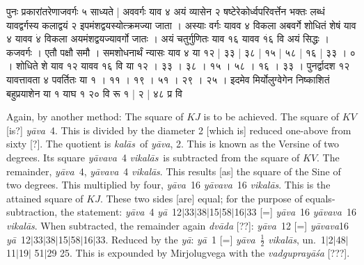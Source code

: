 \documentclass[11pt,a5paper]{book}
\def\kalas{\textit{ka\-l\=as}}
\def\ya{\textit{y\=a}}
\def\yava{\textit{y\=ava}}
\def\yavava{\textit{y\=avava}}
\def\vikalas{\textit{vi\-ka\-l\=as}}
\def\danda{$|$}
\begin{document}
{\iffalse 
\begin{center}
\texttt{[image: 9v.png]}
\captionof{figure}{9v}
\end{center}
\fi 


\newpage
{\s पुनः प्रकारांतरेणाजवर्गः ५ साध्यते | अववर्गः याव ४
अयं व्यासेन २ षष्टेरेकोर्ध्वपरिवर्त्तेन भक्तः लब्धं
यावद्वर्गस्य कलाद्वयं २ इपमंशद्वयस्योत्क्रमज्या जाता । अस्याः वर्गः यावव ४
विकला अबवर्गे शोधितं शेषं याव ४ यावव $\dot{४}$ विकला अयमंशद्वयज्यावर्गो
जातः । अयं चतुर्गुणितः याव १६ यावव $\dot{१६}$ वि अयं
सिद्धः । कजवर्गः । एतौ पक्षौ समौ । समशोधनार्थं न्यासः याव ४ या १२ |
३३ | ३८ | १५ | ५८ | १६ | ३३ । ० । 
शोधिते शे याव १२  यावव १६  वि या १२ । ३३ । ३८ । १५ । ५८ । १६ । ३३ ।  
पुनर्द्वादश १२ यावत्तावता ४ पवर्तितः या १ । ११ । १९ । ५१ । २९ । २५ ।
इदमेव मिर्योलुग्वेगेन निष्काशितं बहुप्रयाशेन
या १ याघ १ २० वि रू १ | २ | ४८ प्र वि }
\newpage

Again, by another method: The square of $KJ$ is to be achieved. The square of $KV$
[is?] \yava\ 4. This is divided by the diameter 2 [which is] reduced one-above from sixty [?].
The quotient is \kalas\ of \yava, 2. This is known as the Versine of two degrees. 
Its square \yavava\ 4 \vikalas\ is subtracted from the square of $KV$. The remainder, 
\yava\ 4, \yavava\ 4 \vikalas.  This results [as] the square of the Sine of two degrees.
This 
multiplied by four, \yava\ 16 \yavava\ 16 \vikalas. This is the attained square of $KJ$. 
These two sides [are] equal; for the purpose of equals-subtraction, the statement:
\yava\ 4 \ya\ 12\danda 33\danda 38\danda 15\danda 58\danda 16\danda 33 
[=]
\yava\ 16 \yavava\ 16 \vikalas. When subtracted, the remainder again \textit{dv\=ada} [??]:
\yava\ 12 [=] \yavava 16 \ya\ 12\danda 33\danda 38\danda 15\danda 58\danda 16\danda 33.
Reduced by the \ya: 
\ya\ 1 [=] \yava\ $\frac{1}{2}$ \vikalas, un.\ 1\danda 2\danda 48\danda 11\danda 19\danda
51\danda 29 25. 
This is expounded by Mirjolugvega with the \textit{vadgupray\=a\'sa} [???]. 

}
\end{document}
